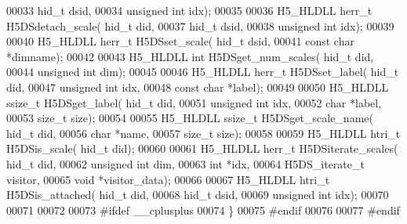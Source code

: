 \begin{DoxyCode}
00033                         hid\_t dsid,
00034                         \textcolor{keywordtype}{unsigned} \textcolor{keywordtype}{int} idx);
00035 
00036 H5\_HLDLL herr\_t  H5DSdetach\_scale( hid\_t did,
00037                         hid\_t dsid,
00038                         \textcolor{keywordtype}{unsigned} \textcolor{keywordtype}{int} idx);
00039 
00040 H5\_HLDLL herr\_t  H5DSset\_scale( hid\_t dsid,
00041                      \textcolor{keyword}{const} \textcolor{keywordtype}{char} *dimname);
00042 
00043 H5\_HLDLL \textcolor{keywordtype}{int} H5DSget\_num\_scales( hid\_t did,
00044                        \textcolor{keywordtype}{unsigned} \textcolor{keywordtype}{int} dim);
00045 
00046 H5\_HLDLL herr\_t  H5DSset\_label( hid\_t did,
00047                      \textcolor{keywordtype}{unsigned} \textcolor{keywordtype}{int} idx,
00048                      \textcolor{keyword}{const} \textcolor{keywordtype}{char} *label);
00049 
00050 H5\_HLDLL ssize\_t H5DSget\_label( hid\_t did,
00051                       \textcolor{keywordtype}{unsigned} \textcolor{keywordtype}{int} idx,
00052                       \textcolor{keywordtype}{char} *label,
00053                       \textcolor{keywordtype}{size\_t} size);
00054 
00055 H5\_HLDLL ssize\_t H5DSget\_scale\_name( hid\_t did,
00056                            \textcolor{keywordtype}{char} *name,
00057                            \textcolor{keywordtype}{size\_t} size);
00058 
00059 H5\_HLDLL htri\_t H5DSis\_scale( hid\_t did);
00060 
00061 H5\_HLDLL herr\_t  H5DSiterate\_scales( hid\_t did,
00062                           \textcolor{keywordtype}{unsigned} \textcolor{keywordtype}{int} dim,
00063                           \textcolor{keywordtype}{int} *idx,
00064                           H5DS\_iterate\_t visitor,
00065                           \textcolor{keywordtype}{void} *visitor\_data);
00066 
00067 H5\_HLDLL htri\_t H5DSis\_attached( hid\_t did,
00068                        hid\_t dsid,
00069                        \textcolor{keywordtype}{unsigned} \textcolor{keywordtype}{int} idx);
00070 
00071 
00072 
00073 \textcolor{preprocessor}{#ifdef \_\_cplusplus}
00074 \}
00075 \textcolor{preprocessor}{#endif}
00076 
00077 \textcolor{preprocessor}{#endif}
\end{DoxyCode}
